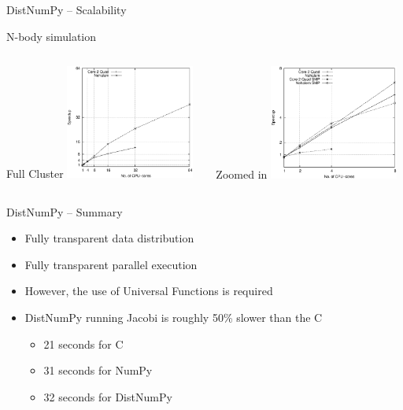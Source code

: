 \documentclass{beamer}
\begin{document}

\begin{frame}{DistNumPy -- Scalability}
\begin{center}
N-body simulation
\end{center}

\begin{columns}
  \begin{column}{0.5\textwidth}
  \begin{center}
    \hspace{21px}Full Cluster
    \includegraphics[width=160px]{../gfx/NbodyStrong}
  \end{center}
  \end{column}
  \begin{column}{0.5\textwidth}
  \begin{center}
    \hspace{23px}Zoomed in
    \includegraphics[width=160px]{../gfx/NbodyStrongSMP}
  \end{center}
  \end{column}
\end{columns}
\end{frame}


\begin{frame}{DistNumPy -- Summary}
\begin{itemize}
  \item Fully transparent data distribution
  \item Fully transparent parallel execution
  \item However, the use of Universal Functions is required
  \item DistNumPy running Jacobi is roughly 50\% slower than the C
  \begin{itemize}
    \item 21 seconds for C
    \item 31 seconds for NumPy
    \item 32 seconds for DistNumPy
  \end{itemize}
\end{itemize}
\end{frame}
\end{document}
